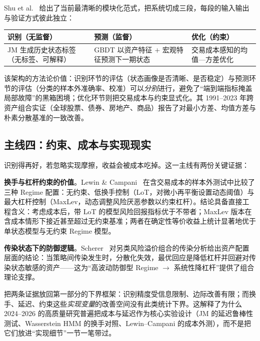Shu et al.~\cite{shu2024b} 给出了当前最清晰的模块化范式，把系统切成三段，每段的输入输出与验证方式彼此独立：

\begin{center}
\begin{tabular}{>{\raggedright\arraybackslash}p{3.7cm}>{\raggedright\arraybackslash}p{3.7cm}>{\raggedright\arraybackslash}p{3.7cm}}
\toprule
\textbf{识别}（无监督） & \textbf{预测}（监督） & \textbf{优化}（约束） \\
\midrule
JM 生成历史状态标签（无标签、可解释） & GBDT 以资产特征 $+$ 宏观特征预测下一期状态 & 交易成本感知的均值—方差优化 \\
\bottomrule
\end{tabular}
\end{center}

该架构的方法论价值：识别环节的评估（状态画像是否清晰、是否稳定）与预测环节的评估（分类的样本外准确率、校准）可以\emph{分别}进行，避免了“端到端指标掩盖局部故障”的黑箱困境；优化环节则把交易成本与约束显式化。其 1991--2023 年跨资产组合实证（全球股票、债券、房地产、商品）报告了对最小方差、均值方差与朴素分散基准的一致改善。

\subsection{主线四：约束、成本与实现现实}

识别得再好，若忽略实现摩擦，收益会被成本吃掉。这一主线有两份关键证据：

\textbf{换手与杠杆约束的价值}。Lewin \& Campani~\cite{lewin2023} 在含交易成本的样本外测试中比较了三种 Regime 配置：无约束、低换手控制（LoT，对微小再平衡设置动态阈值）与最大杠杆控制（MaxLev，动态调整风险厌恶参数以约束杠杆）。结论具备直接工程含义：考虑成本后，带 LoT 的模型风险回报指标优于不带者；MaxLev 版本在含成本情形下接近甚至超过无约束基准；两者在确定性等价收益上统计显著地优于单状态模型与无约束 Regime 模型。

\textbf{传染状态下的防御逻辑}。Scherer~\cite{scherer2020} 对另类风险溢价组合的传染分析给出资产配置层面的结论：当策略间传染发生时，分散化失效，最优回应是降低杠杆并回避对传染状态敏感的资产——这为“高波动防御型 Regime $\to$ 系统性降杠杆”提供了组合理论支撑。

\begin{remark}
把两条证据放回第一部分的下界框架：识别精度受信息限制、边际改善有限；而换手、延迟、约束这些\emph{实现变量}的改善空间没有此类统计下界。这解释了为什么 2024--2026 的高质量研究普遍把成本与延迟作为核心实验设计（JM 的延迟鲁棒性测试、Wasserstein HMM 的换手对照、Lewin--Campani 的成本外测），而不是把它们放进“实现细节”一节一笔带过。
\end{remark}


